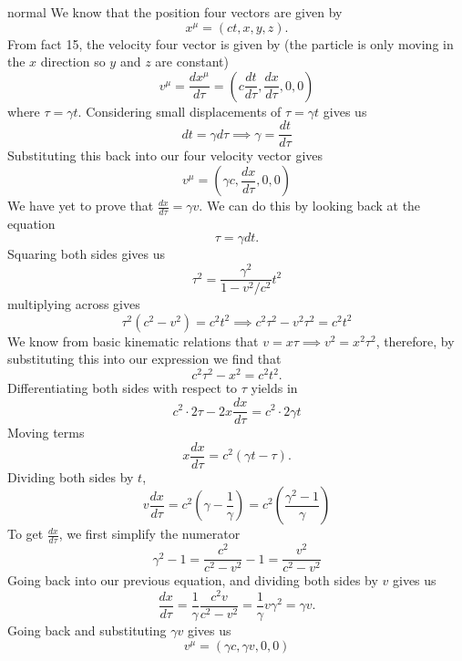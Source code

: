 \begin{solution}{normal}
We know that the position four vectors are given by 
\[x^\mu = (ct, x, y, z).\]
From fact 15, the velocity four vector is given by (the particle is only moving in the $x$ direction so $y$ and $z$ are constant)
\[v^\mu = \frac{dx^\mu}{d\tau} = \left(c\frac{dt}{d\tau}, \frac{dx}{d\tau}, 0, 0\right)\]
where $\tau = \gamma t$. Considering small displacements of $\tau = \gamma t$ gives us 
\[dt = \gamma d\tau\implies \gamma = \frac{dt}{d\tau}\]
Substituting this back into our four velocity vector gives
\[v^\mu = \left(\gamma c, \frac{dx}{d\tau}, 0, 0\right)\]
We have yet to prove that $\frac{dx}{d\tau} = \gamma v$. We can do this by looking back at the equation 
\[\tau = \gamma dt.\]
Squaring both sides gives us 
\[\tau^2 = \frac{\gamma^2}{1-v^2/c^2}t^2\]
multiplying across gives
\[\tau^2 (c^2 - v^2) = c^2t^2 \implies c^2\tau^2 - v^2\tau^2 = c^2t^2\]
We know from basic kinematic relations that $v=x\tau\implies v^2 = x^2\tau^2$, therefore, by substituting this into our expression we find that
\[c^2\tau^2 - x^2= c^2t^2.\]
Differentiating both sides with respect to $\tau$ yields in
\[c^2\cdot 2\tau - 2x\frac{dx}{d\tau} = c^2\cdot 2\gamma t\]
Moving terms 
\[x\frac{dx}{d\tau} = c^2(\gamma t - \tau).\]
Dividing both sides by $t$,
\[v\frac{dx}{d\tau} = c^2\left(\gamma - \frac{1}{\gamma}\right) = c^2\left(\frac{\gamma^2 -1}{\gamma}\right)\]
To get $\frac{dx}{d\tau}$, we first simplify the numerator
\[\gamma^2 - 1 = \frac{c^2}{c^2 - v^2} - 1 = \frac{v^2}{c^2 - v^2}\]
Going back into our previous equation, and dividing both sides by $v$ gives us 
\[\frac{dx}{d\tau} = \frac{1}{\gamma}\frac{c^2v}{c^2 - v^2} = \frac{1}{\gamma}v\gamma^2 = \gamma v.\]
Going back and substituting $\gamma v$ gives us 
\[\boxed{v^\mu = (\gamma c, \gamma v, 0, 0)}\]

\end{solution}